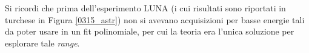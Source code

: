 Si ricordi che prima dell'esperimento LUNA (i cui risultati sono riportati in turchese in Figura \ref{0315_astr}) non si avevano acquisizioni per basse energie tali da poter usare in un fit polinomiale, per cui la teoria era l'unica soluzione per esplorare tale \textit{range}.






